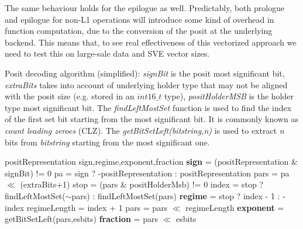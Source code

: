 The same behaviour holds for the epilogue as well.
Predictably, both prologue and epilogue for non-L1 operations will introduce some kind of overhead in function computation, due to the conversion of the posit at the underlying backend. This means that, to see real effectiveness of this vectorized approach we need to test this on large-sale data and SVE vector sizes.



\begin{algorithm}
 \caption{Posit decoding algorithm (simplified): \textit{signBit} is the posit most significant bit, \textit{extraBits} takes into account of underlying holder type that may not be aligned with the posit size (e.g.  stored in an $int16\_t$ type), \textit{positHolderMSB} is the holder type most significant bit. The \textit{findLeftMostSet} function is used to find the index of the first set bit starting from the most significant bit. It is commonly known as \textit{count leading zeroes} (CLZ). The \textit{getBitSetLeft(bitstring,n)} is used to extract \textit{n} bits from \textit{bitstring} starting from the most significant one.}
 \label{alg:positdec}
 \begin{algorithmic}[1]
 \renewcommand{\algorithmicrequire}{\textbf{Input:}}
 \renewcommand{\algorithmicensure}{\textbf{Output:}}
 \Require positRepresentation
 \Ensure sign,regime,exponent,fraction
    \State \textbf{sign} = (positRepresentation \& signBit) != 0
    \State pa = sign ? -positRepresentation : positRepresentation
    \State pars = pa $\ll$ (extraBits+1)
    \State stop = (pars \& positHolderMsb) != 0
    \State index = stop ? findLeftMostSet($\sim$pars) : findLeftMostSet(pars)
    \State \textbf{regime} = stop ? index - 1 : -index
    \State regimeLength = index + 1
    \State pars = pars $\ll$ regimeLength
    \State \textbf{exponent} = getBitSetLeft(pars,esbits)
    \State \textbf{fraction} = pars $\ll$ esbits 
\end{algorithmic} 
\end{algorithm}


